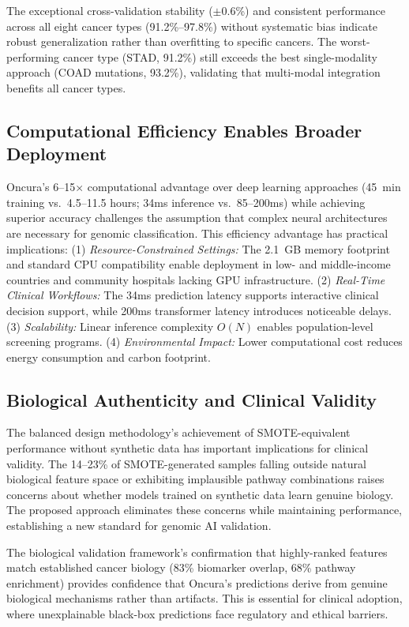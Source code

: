 \documentclass[manuscript, screen, review]{jair}
\begin{document}
The exceptional cross-validation stability ($\pm$0.6\%) and consistent performance across all eight cancer types (91.2\%--97.8\%) without systematic bias indicate robust generalization rather than overfitting to specific cancers. The worst-performing cancer type (STAD, 91.2\%) still exceeds the best single-modality approach (COAD mutations, 93.2\%), validating that multi-modal integration benefits all cancer types.

\subsection{Computational Efficiency Enables Broader Deployment}

Oncura's 6--15$\times$ computational advantage over deep learning approaches (45~min training vs.\ 4.5--11.5 hours; 34ms inference vs.\ 85--200ms) while achieving superior accuracy challenges the assumption that complex neural architectures are necessary for genomic classification. This efficiency advantage has practical implications: (1) \emph{Resource-Constrained Settings:} The 2.1~GB memory footprint and standard CPU compatibility enable deployment in low- and middle-income countries and community hospitals lacking GPU infrastructure. (2) \emph{Real-Time Clinical Workflows:} The 34ms prediction latency supports interactive clinical decision support, while 200ms transformer latency introduces noticeable delays. (3) \emph{Scalability:} Linear inference complexity $O(N)$ enables population-level screening programs. (4) \emph{Environmental Impact:} Lower computational cost reduces energy consumption and carbon footprint.

\subsection{Biological Authenticity and Clinical Validity}

The balanced design methodology's achievement of SMOTE-equivalent performance without synthetic data has important implications for clinical validity. The 14--23\% of SMOTE-generated samples falling outside natural biological feature space or exhibiting implausible pathway combinations raises concerns about whether models trained on synthetic data learn genuine biology. The proposed approach eliminates these concerns while maintaining performance, establishing a new standard for genomic AI validation.

The biological validation framework's confirmation that highly-ranked features match established cancer biology (83\% biomarker overlap, 68\% pathway enrichment) provides confidence that Oncura's predictions derive from genuine biological mechanisms rather than artifacts. This is essential for clinical adoption, where unexplainable black-box predictions face regulatory and ethical barriers.
\end{document}
